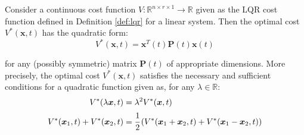 \documentclass[a4paper,11pt]{book}
\numberwithin{figure}{chapter}
\numberwithin{equation}{chapter}
\numberwithin{table}{chapter}
\newtheorem{theorem}{Theorem}[chapter]
\theoremstyle{definition}
\newcounter{boxed-theorem}
\newenvironment{boxed-theorem}[1]
{\begin{shaded} \begin{theorem}{#1}}
{\end{theorem} \end{shaded}}
\newcounter{boxed-definition}
\begin{document}
\begin{boxed-theorem}{} \label{th:costQuadraForm}
	Consider a continuous cost function $V : \mathbb{R}^{n \times r \times 1} \rightarrow \mathbb{R}$ given as the LQR cost function defined in Definition \ref{def:lqr} for a linear system. Then the optimal cost $V^*(\bm{x}, t)$ has the quadratic form:
	\begin{equation}
		V^*(\bm{x}, t) = \bm{x}^T(t) \bm{P}(t) \bm{x}(t)
	\end{equation}
	
\noindent for any (possibly symmetric) matrix $\bm{P}(t)$ of appropriate dimensions. More precisely, the optimal cost $V^*(\bm{x}, t)$ satisfies the necessary and sufficient conditions for a quadratic function given as, for any $\lambda \in \mathbb{R}$:
	\begin{align} 
		V^*(\lambda \bm{x}, t) &= \lambda^2 V^*(\bm{x}, t) \label{eq:costQuadraForm021} \\ 
		V^*(\bm{x}_1 , t) + V^*(\bm{x}_2 , t) &= \cfrac{1}{2} \left( V^*(\bm{x}_1 + \bm{x}_2 , t) + V^*(\bm{x}_1 - \bm{x}_2 , t) \right) \label{eq:costQuadraForm022}
	\end{align}
\end{boxed-theorem}
\end{document}
